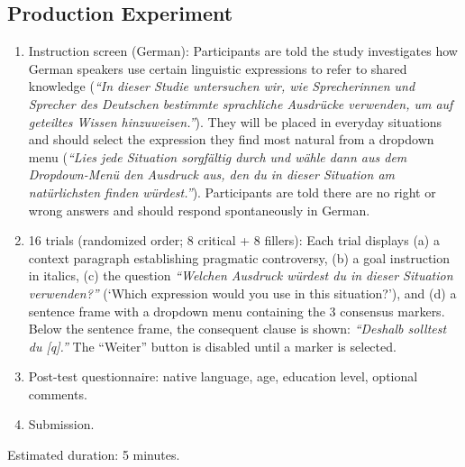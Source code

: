 \documentclass[12pt]{article}
\begin{document}
\subsection{Production Experiment}
\begin{enumerate}
    \item Instruction screen (German): Participants are told the study investigates how German speakers use certain linguistic expressions to refer to shared knowledge (\textit{``In dieser Studie untersuchen wir, wie Sprecherinnen und Sprecher des Deutschen bestimmte sprachliche Ausdr\"ucke verwenden, um auf geteiltes Wissen hinzuweisen.''}). They will be placed in everyday situations and should select the expression they find most natural from a dropdown menu (\textit{``Lies jede Situation sorgf\"altig durch und w\"ahle dann aus dem Dropdown-Men\"u den Ausdruck aus, den du in dieser Situation am nat\"urlichsten finden w\"urdest.''}). Participants are told there are no right or wrong answers and should respond spontaneously in German.
    \item 16 trials (randomized order; 8 critical + 8 fillers): Each trial displays (a) a context paragraph establishing pragmatic controversy, (b) a goal instruction in italics, (c) the question \textit{``Welchen Ausdruck w\"urdest du in dieser Situation verwenden?''} (`Which expression would you use in this situation?'), and (d) a sentence frame with a dropdown menu containing the 3 consensus markers. Below the sentence frame, the consequent clause is shown: \textit{``Deshalb solltest du [q].''} The ``Weiter'' button is disabled until a marker is selected.
    \item Post-test questionnaire: native language, age, education level, optional comments.
    \item Submission.
\end{enumerate}
Estimated duration: 5 minutes.
\end{document}
